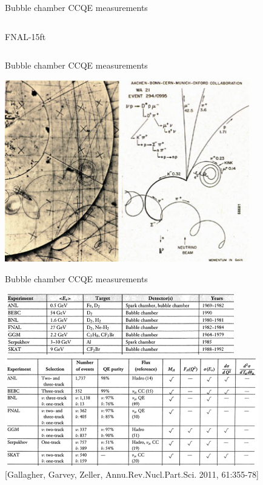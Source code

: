 \begin{frame}{Bubble chamber CCQE measurements}
\begin{columns}
\begin{column}{0.33\textwidth}
\begin{center}
     {\small FNAL-15ft}
    \end{center}
  \end{column}
\end{columns}

\end{frame}


%
%
%

\begin{frame}{Bubble chamber CCQE measurements}

\begin{center}
  \includegraphics[width=0.80\textwidth]{./images/bc/nu_event_display_and_schematic_1.jpg}\\
\end{center}

\end{frame}


%
%

\begin{frame}{Bubble chamber CCQE measurements}

\begin{center}
 \includegraphics[width=0.75\textwidth]{./images/nuint/ccqe/pre1990_investigations_1.png}\\
 \includegraphics[width=0.83\textwidth]{./images/nuint/ccqe/pre1990_investigations_2.png}\\
 {\scriptsize \color{blue}[Gallagher, Garvey, Zeller, Annu.Rev.Nucl.Part.Sci. 2011, 61:355-78]}\\
\end{center}
\end{frame}

